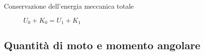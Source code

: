 \documentclass[a4paper,11pt,italian]{article}
\begin{document}
\begin{description}
  
  \item[Conservazione dell'energia meccanica totale] 
  $ U_0 + K_0 = U_1 + K_1 $
\end{description}



\subsection{Quantità di moto e momento angolare}
\end{document}
